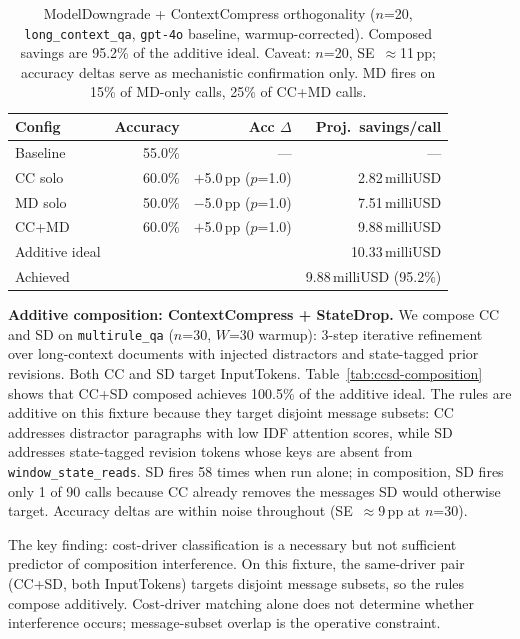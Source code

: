 \documentclass[sigconf,9pt]{acmart}
\begin{document}
\begin{table}[t]
\caption{ModelDowngrade + ContextCompress orthogonality ($n$=20,
\texttt{long\_context\_qa}, \texttt{gpt-4o} baseline, warmup-corrected).
Composed savings are 95.2\% of the additive ideal. Caveat: $n$=20,
SE~$\approx$11\,pp; accuracy deltas serve as mechanistic confirmation only.
MD fires on 15\% of MD-only calls, 25\% of CC+MD calls.}
\label{tab:mdcc-orthogonality}
\small
\begin{tabular}{lrrr}
\toprule
Config & Accuracy & Acc $\Delta$ & Proj.\ savings/call \\
\midrule
Baseline  & 55.0\% & --- & --- \\
CC solo   & 60.0\% & $+$5.0\,pp ($p$=1.0) & 2.82\,milliUSD \\
MD solo   & 50.0\% & $-$5.0\,pp ($p$=1.0) & 7.51\,milliUSD \\
CC+MD     & 60.0\% & $+$5.0\,pp ($p$=1.0) & 9.88\,milliUSD \\
\midrule
Additive ideal & & & 10.33\,milliUSD \\
Achieved & & & 9.88\,milliUSD (95.2\%) \\
\bottomrule
\end{tabular}
\end{table}

\textbf{Additive composition: ContextCompress + StateDrop.} We compose CC and SD on
\texttt{multirule\_qa} ($n$=30, $W$=30 warmup): 3-step iterative refinement over
long-context documents with injected distractors and state-tagged prior revisions.
Both CC and SD target InputTokens. Table~\ref{tab:ccsd-composition} shows that CC+SD
composed achieves 100.5\% of the additive ideal. The rules are additive on this
fixture because they target disjoint message subsets: CC addresses distractor
paragraphs with low IDF attention scores, while SD addresses state-tagged revision
tokens whose keys are absent from \texttt{window\_state\_reads}. SD fires 58 times
when run alone; in composition, SD fires only 1 of 90 calls because CC already
removes the messages SD would otherwise target. Accuracy deltas are within noise
throughout (SE~$\approx$9\,pp at $n$=30).

The key finding: cost-driver classification is a necessary but not sufficient
predictor of composition interference. On this fixture, the same-driver pair
(CC+SD, both InputTokens) targets disjoint message subsets, so the rules compose
additively. Cost-driver matching alone does not determine whether interference occurs;
message-subset overlap is the operative constraint.
\end{document}
